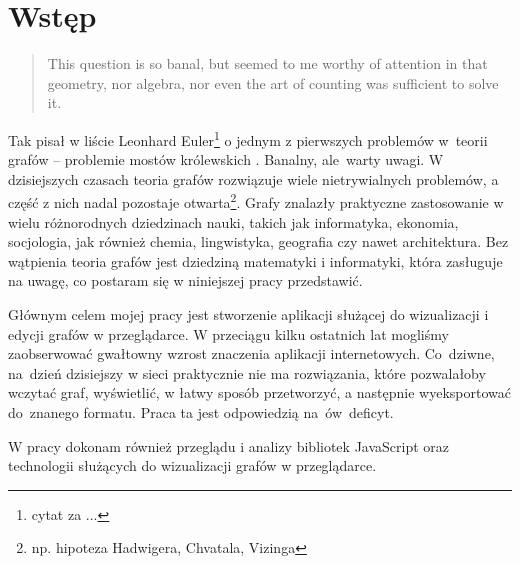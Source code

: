 \chapter*{Wstęp}

\blockquote{This question is so banal, but seemed to me worthy of attention in that geometry, nor algebra, nor even the art of counting was sufficient to solve it.}

Tak pisał w liście Leonhard Euler\footnote{cytat za ...} o jednym z pierwszych problemów w~teorii grafów -- problemie mostów królewskich \cite[120]{einstein}. Banalny, ale~warty uwagi. W dzisiejszych czasach teoria grafów rozwiązuje wiele nietrywialnych problemów, a część z nich nadal pozostaje otwarta\footnote{np. hipoteza Hadwigera, Chvatala, Vizinga}. Grafy znalazły praktyczne zastosowanie w wielu różnorodnych dziedzinach nauki, takich jak informatyka, ekonomia, socjologia, jak również chemia, lingwistyka, geografia czy nawet architektura. Bez wątpienia teoria grafów jest dziedziną matematyki i informatyki, która zasługuje na uwagę, co postaram się w niniejszej pracy przedstawić.

Głównym celem mojej pracy jest stworzenie aplikacji służącej do wizualizacji i edycji grafów w przeglądarce. W przeciągu kilku ostatnich lat mogliśmy zaobserwować gwałtowny wzrost znaczenia aplikacji internetowych. Co~dziwne, na~dzień dzisiejszy w sieci praktycznie nie ma rozwiązania, które pozwalałoby wczytać graf, wyświetlić, w łatwy sposób przetworzyć, a następnie wyeksportować do~znanego formatu. Praca ta jest odpowiedzią na~ów~deficyt. 

W pracy dokonam również przeglądu i analizy bibliotek JavaScript oraz technologii służących do wizualizacji grafów w przeglądarce.

\thispagestyle{empty}
